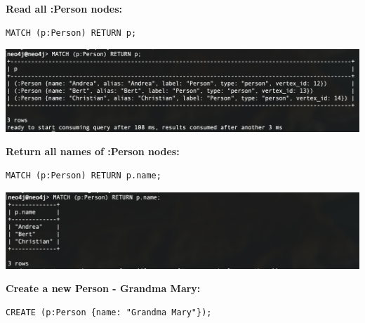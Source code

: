\documentclass[14pt,a4paper]{extarticle}
\begin{document}
	\noindent \textbf{Read all :Person nodes:}
	\begin{lstlisting}[style=sql]
MATCH (p:Person) RETURN p;
	\end{lstlisting}
	\includegraphics[width=\textwidth]{images/sc02.png}

	\noindent \textbf{Return all names of :Person nodes:}
	\begin{lstlisting}[style=sql]
MATCH (p:Person) RETURN p.name;
	\end{lstlisting}
	\includegraphics[width=\textwidth]{images/sc03.png}

	\pagebreak

	\noindent \textbf{Create a new Person - Grandma Mary:}
	\begin{lstlisting}[style=sql]
CREATE (p:Person {name: "Grandma Mary"});
	\end{lstlisting}




	

\end{document}
